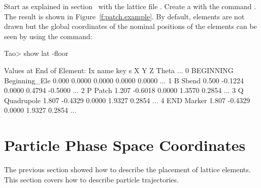 \documentclass{hitec}
\newcommand{\Section}[1]{\section{#1}\vspace*{-1ex}}
\begin{document}
Start \tao as explained in section~ with the lattice file . Create
a  with the command . The result is shown in
Figure~\ref{f:patch.example}.  By default,  elements are not drawn but the global
coordinates of the nominal positions of the elements can be seen by using the 
command:
\begin{code}
Tao> show lat -floor

      Values at End of Element:
Ix  name      key               s          X         Y         Z     Theta ...
 0  BEGINNING Beginning_Ele  0.000    0.0000    0.0000    0.0000    0.0000 ...
 1  B         Sbend          0.500   -0.1224    0.0000    0.4794   -0.5000 ...
 2  P         Patch          1.207   -0.6018    0.0000    1.3570    0.2854 ...
 3  Q         Quadrupole     1.807   -0.4329    0.0000    1.9327    0.2854 ...
 4  END       Marker         1.807   -0.4329    0.0000    1.9327    0.2854 ...
\end{code}

\Section{Particle Phase Space Coordinates}

The previous section showed how to describe the placement of lattice elements. This section
covers how to describe particle trajectories. 
\end{document}
